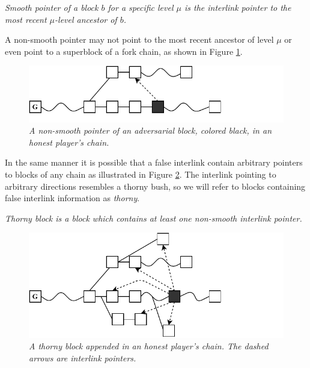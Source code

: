 \begin{definition}
    \textit{Smooth pointer of a block $b$ for a specific level $\mu$ is the     interlink pointer to the most recent $\mu$-level ancestor of $b$.}
	\label{defn:smooth_pointer}
\end{definition}


A non-smooth pointer may not point to the most recent ancestor of level $\mu$ or even point to a superblock of a fork chain, as shown in Figure \ref{fig:false_interlink}.

\begin{figure}[h]
	\begin{center}
		\includegraphics[scale=0.7]{figures/false_interlink.pdf}
	\end{center}
    \caption{\textit{A non-smooth pointer of an adversarial block, colored  black, in an honest player's chain.}}
	\label{fig:false_interlink}
\end{figure}

In the same manner it is possible that a false interlink contain arbitrary pointers to blocks of any chain as illustrated in Figure \ref{fig:thorny_block}. The interlink pointing to arbitrary directions resembles a thorny bush, so we will refer to blocks containing false interlink information as \emph{thorny}.

\begin{definition}
	\textit{Thorny block is a block which contains at least one non-smooth interlink pointer.}
	\label{defn:thorny_block}
\end{definition}

\begin{figure}[h]
	\begin{center}
		\includegraphics[scale=0.75]{figures/thorny_block.pdf}
	\end{center}
	\caption{\textit{A thorny block appended in an honest player's chain. The dashed arrows 	are interlink pointers.}}
	\label{fig:thorny_block}
\end{figure}

